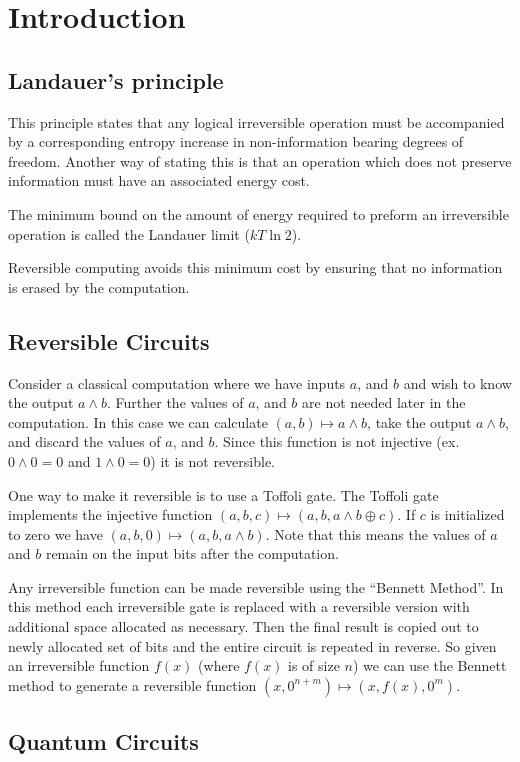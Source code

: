 \chapter{Introduction}

\section{Landauer's principle}

This principle states that any logical irreversible operation must be
accompanied by a corresponding entropy increase in non-information bearing
degrees of freedom\cite{bennett03}. Another way of stating this is that
an operation which does not preserve information must have an associated energy
cost.

The minimum bound on the amount of energy required to preform an irreversible
operation is called the Landauer limit ($kT\ln 2$).

Reversible computing avoids this minimum cost by ensuring that no information is
erased by the computation.

\section{Reversible Circuits}

Consider a classical computation where we have inputs $a$, and $b$
and wish to know the output $a\land b$. Further the values of $a$, and $b$ are
not needed later in the computation. In this case we can calculate $(a,b)
\mapsto a \land b$, take the output $a\land b$, and discard the values of $a$,
and $b$. Since this function is not injective (ex. $0\land 0 = 0$ and $1 \land 0
= 0$) it is not reversible.

One way to make it reversible is to use a Toffoli gate. The Toffoli gate
implements the injective function $(a,b,c) \mapsto (a,b,a\land b \oplus c)$. If
$c$ is initialized to zero we have $(a,b,0) \mapsto (a,b,a\land b)$. Note that
this means the values of $a$ and $b$ remain on the input bits after the
computation.

Any irreversible function can be made reversible using the ``Bennett
Method''\cite{Bennett:73}. In this method each irreversible gate is replaced
with a reversible version with additional space allocated as necessary. Then the
final result is copied out to newly allocated set of bits and the entire circuit
is repeated in reverse. So given an irreversible function $f(x)$ (where $f(x)$
is of size $n$) we can use the Bennett method to generate a reversible function
$(x,0^{n+m}) \mapsto (x,f(x),0^m)$.


\section{Quantum Circuits}




